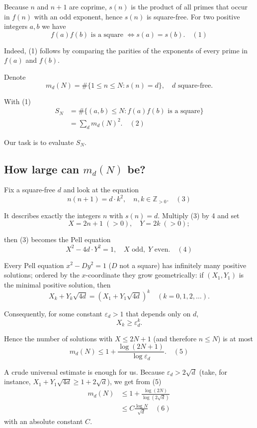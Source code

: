 \documentclass[12pt,a4paper]{article}
\theoremstyle{definition}
\begin{document}
        Because $n$ and $n+1$ are coprime, $s(n)$ is the product of all primes that occur in $f(n)$ with an odd exponent, hence $s(n)$ is square-free. For two positive integers $a,b$ we have
        \[f(a)f(b) \text{ is a square } \Longleftrightarrow s(a) = s(b). \quad (1)\]

        Indeed, (1) follows by comparing the parities of the exponents of every prime in $f(a)$ and $f(b)$.

        Denote
        \[m_d(N) = \#\{1 \leq n \leq N : s(n) = d\}, \quad d \text{ square-free}.\]

        With (1)
        \begin{align}
            S_N &= \#\{(a,b) \leq N : f(a)f(b) \text{ is a square}\} \\
            &= \sum_d m_d(N)^2. \quad (2)
        \end{align}

        Our task is to evaluate $S_N$.

        \subsection*{How large can $m_d(N)$ be?}
        Fix a square-free $d$ and look at the equation
        \[n(n+1) = d \cdot k^2, \quad n,k \in \mathbb{Z}_{>0}. \quad (3)\]

        It describes exactly the integers $n$ with $s(n) = d$. Multiply (3) by 4 and set
        \[X = 2n+1 \; (>0), \quad Y = 2k \; (>0);\]

        then (3) becomes the Pell equation
        \[X^2 - 4d \cdot Y^2 = 1, \quad X \text{ odd}, \; Y \text{ even}. \quad (4)\]

        Every Pell equation $x^2 - Dy^2 = 1$ ($D$ not a square) has infinitely many positive solutions; ordered by the $x$-coordinate they grow geometrically: if $(X_1, Y_1)$ is the minimal positive solution, then
        \[X_k + Y_k\sqrt{4d} = (X_1 + Y_1\sqrt{4d})^k \quad (k = 0,1,2,\ldots).\]

        Consequently, for some constant $\varepsilon_d > 1$ that depends only on $d$,
        \[X_k \geq \varepsilon_d^k.\]

        Hence the number of solutions with $X \leq 2N+1$ (and therefore $n \leq N$) is at most
        \[m_d(N) \leq 1 + \frac{\log(2N+1)}{\log \varepsilon_d}. \quad (5)\]

        A crude universal estimate is enough for us. Because $\varepsilon_d > 2\sqrt{d}$ (take, for instance, $X_1 + Y_1\sqrt{4d} \geq 1 + 2\sqrt{d}$), we get from (5)
        \begin{align}
            m_d(N) &\leq 1 + \frac{\log(2N)}{\log(2\sqrt{d})} \\
            &\leq C\frac{\log N}{\sqrt{d}} \quad (6)
        \end{align}
        with an absolute constant $C$.
\end{document}
